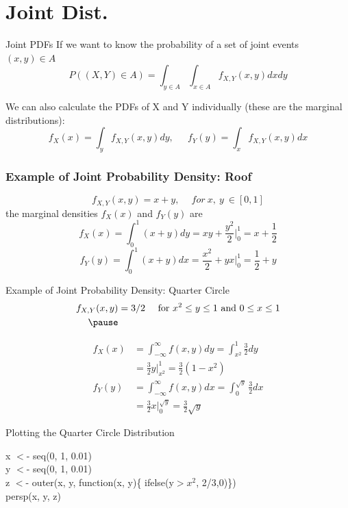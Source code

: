 \documentclass[aspectratio=169, handout]{beamer}
\numberwithin{equation}{section}
\begin{document}
\section{Joint Dist.}



\begin{frame}{Joint PDFs}
If we want to know the probability of a set of joint events $(x, y) \in A$
$$P((X,Y)\in A)=\int_{y\in A}\int_{x\in A}  f_{X,Y}(x, y) dxdy$$\pause

We can also calculate the PDFs of X and Y individually (these are the marginal distributions):
$$f_X(x)=\int_y f_{X,Y}(x, y)dy, \ \ \quad f_Y(y)=\int_x f_{X,Y}(x, y)dx$$

\end{frame}






\begin{frame}
\frametitle{Example of Joint Probability Density: Roof}
$$f_{X,Y}(x,y) = x+y,\ \quad for\ x,\ y\ \in [0,1]$$\pause
the marginal densities $f_X(x)$ and $f_Y(y)$ are
$$f_X(x)=\int_0^1(x+y)dy= xy+\frac{y^2}{2}|_0^1= x+\frac{1}{2}$$\pause
$$f_Y(y)=\int_0^1(x+y)dx=\frac{x^2}{2}+yx|_0^1=\frac{1}{2}+y$$
\end{frame}



\begin{frame}{Example of Joint Probability Density: Quarter Circle}
\begin{align*}
f_{X,Y}(x,y) &= 3/2 \quad \text{ for }x^2\leq y\leq 1 \text{ and }0\leq x\leq 1\\\pause
\end{align*}

\begin{align*}
f_X(x) &= \int_{-\infty}^\infty f(x,y) dy =\int_{x^2}^1\frac{3}{2} dy\\
&=\frac{3}{2}y|_{x^2}^1=\frac{3}{2}(1-x^2)\\
f_Y(y) &= \int_{-\infty}^\infty f(x,y) dx=\int_{0}^{\sqrt{y}}\frac{3}{2} dx\\
&=\frac{3}{2}x|_{0}^{\sqrt{y}}=\frac{3}{2}\sqrt{y}
\end{align*}

\end{frame}


\begin{frame}{Plotting the Quarter Circle Distribution}

x $<$- seq(0, 1, 0.01)\\
y $<$- seq(0, 1, 0.01)\\
z $<$- outer(x, y, function(x, y)\{ ifelse(y$>x^2$, 2/3,0)\})\\
persp(x, y, z)

\end{frame}
\end{document}
